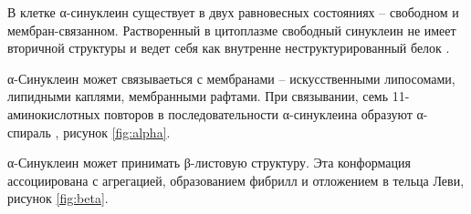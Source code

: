 В клетке α-синуклеин существует в двух равновесных состояниях -- свободном  и мембран-связанном. Растворенный в цитоплазме свободный синуклеин не имеет вторичной структуры и ведет себя как внутренне неструктурированный белок \cite{burre_properties_2013, uversky_protein-chameleon:_2003}.

α-Синуклеин может связываеться с мембранами -- искусственными липосомами, липидными каплями, мембранными рафтами. При связывании, семь 11-аминокислотных повторов в последовательности α-синуклеина образуют α-спираль \cite{davidson_stabilization_1998, bisaglia_topological_2005, jao_structure_2008}, рисунок \ref{fig:alpha}. 

α-Синуклеин может принимать β-листовую структуру. Эта конформация ассоциирована с агрегацией, образованием фибрилл и отложением в тельца Леви, рисунок \ref{fig:beta}.

